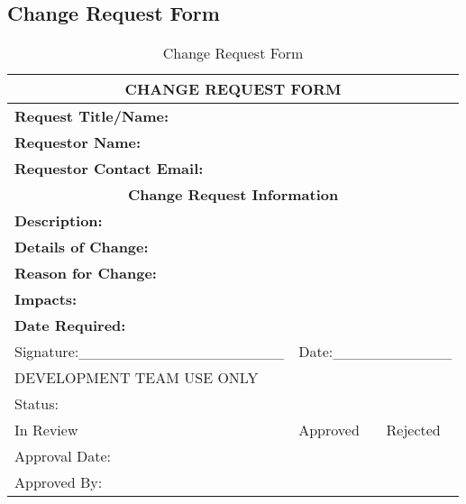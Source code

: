 \begin{appendices}




\chapter{Change Request Form}
\begin{table}[!h]
\centering
\renewcommand{\arraystretch}{2.2}
\begin{tabular}{p{10cm} p{3cm} p{3cm} p{3cm}}
\hline
\multicolumn{4}{|c|}{\textbf{CHANGE REQUEST FORM}}\\ \hline
\multicolumn{1}{|l|}{\textbf{Request Title/Name:}}& \multicolumn{3}{l|}{}\\ \hline
\multicolumn{2}{|l|}{\textbf{Requestor Name:}}& \multicolumn{2}{l|}{}\\ \hline
\multicolumn{2}{|l|}{\textbf{Requestor Contact Email:}}& \multicolumn{2}{l|}{} \\ \hline
\multicolumn{4}{|c|}{\textbf{Change Request Information}}\\ \hline
\multicolumn{1}{|l|}{\textbf{Description:}}& \multicolumn{3}{l|}{}\\ \hline
\multicolumn{1}{|l|}{\textbf{Details of Change:}}& \multicolumn{3}{l|}{} \\ \hline
\multicolumn{1}{|l|}{\textbf{Reason for Change:}}& \multicolumn{3}{l|}{}\\ \hline
\multicolumn{1}{|l|}{\textbf{Impacts:}}& \multicolumn{3}{l|}{}\\ \hline
\multicolumn{1}{|l|}{\textbf{Date Required:}}& \multicolumn{3}{l|}{}\\ \hline
Signature:\_\_\_\_\_\_\_\_\_\_\_\_\_\_\_\_\_\_\_ & \multicolumn{3}{l}{Date:\_\_\_\_\_\_\_\_\_\_\_}\\
\multicolumn{4}{l}{DEVELOPMENT TEAM USE ONLY}\\ \hline
\multicolumn{4}{|l|}{Status:}\\ \hline
\multicolumn{1}{|l|}{In Review}& \multicolumn{2}{l|}{Approved}& \multicolumn{1}{l|}{Rejected} \\ \hline
\multicolumn{1}{|l|}{Approval Date:}& \multicolumn{2}{l|}{}& \multicolumn{1}{l|}{}\\ \hline
\multicolumn{1}{|l|}{Approved By:}& \multicolumn{2}{l|}{}& \multicolumn{1}{l|}{}\\ \hline
\end{tabular}
\caption{Change Request Form}
\label{change_request}
\end{table}


\end{appendices}
